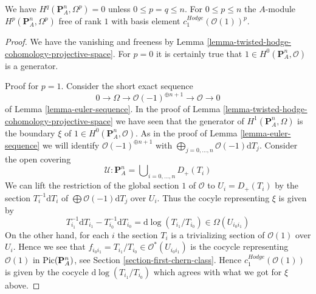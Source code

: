 \begin{lemma}
\label{lemma-hodge-cohomology-projective-space}
We have $H^q(\mathbf{P}^n_A, \Omega^p) = 0$
unless $0 \leq p = q \leq n$. For $0 \leq p \leq n$ the $A$-module
$H^p(\mathbf{P}^n_A, \Omega^p)$ free of rank $1$ with basis element
$c_1^{Hodge}(\mathcal{O}(1))^p$.
\end{lemma}

\begin{proof}
We have the vanishing and freeness by
Lemma \ref{lemma-twisted-hodge-cohomology-projective-space}.
For $p = 0$ it is certainly true that
$1 \in H^0(\mathbf{P}^n_A, \mathcal{O})$ is a generator.

\medskip\noindent
Proof for $p = 1$. Consider the short exact sequence
$$
0 \to \Omega \to \mathcal{O}(-1)^{\oplus n + 1} \to \mathcal{O} \to 0
$$
of Lemma \ref{lemma-euler-sequence}. In the proof of
Lemma \ref{lemma-twisted-hodge-cohomology-projective-space}
we have seen that the generator of $H^1(\mathbf{P}^n_A, \Omega)$
is the boundary $\xi$ of $1 \in H^0(\mathbf{P}^n_A, \mathcal{O})$.
As in the proof of Lemma \ref{lemma-euler-sequence} we will identify
$\mathcal{O}(-1)^{\oplus n + 1}$ with
$\bigoplus_{j = 0, \ldots, n} \mathcal{O}(-1)\text{d}T_j$.
Consider the open covering
$$
\mathcal{U} : 
\mathbf{P}^n_A =
\bigcup\nolimits_{i = 0, \ldots, n} D_{+}(T_i)
$$
We can lift the restriction of the global section $1$ of $\mathcal{O}$
to $U_i = D_+(T_i)$ by the section $T_i^{-1} \text{d}T_i$ of
$\bigoplus \mathcal{O}(-1)\text{d}T_j$ over $U_i$. Thus the cocyle
representing $\xi$ is given by
$$
T_{i_1}^{-1} \text{d}T_{i_1} - T_{i_0}^{-1} \text{d}T_{i_0} =
\text{d}\log(T_{i_1}/T_{i_0}) \in \Omega(U_{i_0i_1})
$$
On the other hand, for each $i$ the section $T_i$ is a trivializing
section of $\mathcal{O}(1)$ over $U_i$. Hence we see that
$f_{i_0i_1} = T_{i_1}/T_{i_0} \in \mathcal{O}^*(U_{i_0i_1})$
is the cocycle representing $\mathcal{O}(1)$ in $\mathop{\mathrm{Pic}}\nolimits(\mathbf{P}^n_A)$,
see Section \ref{section-first-chern-class}.
Hence $c_1^{Hodge}(\mathcal{O}(1))$
is given by the cocycle $\text{d}\log(T_{i_1}/T_{i_0})$
which agrees with what we got for $\xi$ above.


\end{proof}
